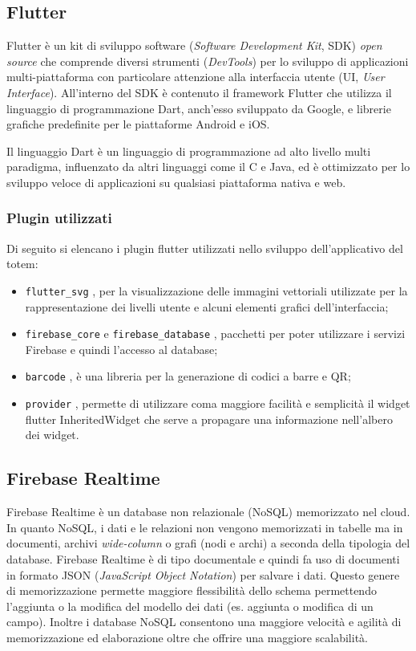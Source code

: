 \subsection{Flutter}
Flutter \cite{flutter} è un kit di sviluppo software (\textit{Software Development Kit}, SDK) \textit{open source} che comprende diversi strumenti (\textit{DevTools}) per lo sviluppo di applicazioni multi-piattaforma con particolare attenzione alla interfaccia utente (UI, \textit{User Interface}). All'interno del SDK è contenuto il framework Flutter che utilizza il linguaggio di programmazione Dart, anch'esso sviluppato da Google, e librerie grafiche predefinite per le piattaforme Android e iOS.

Il linguaggio Dart è un linguaggio di programmazione ad alto livello multi paradigma, influenzato da altri linguaggi come il C e Java, ed è ottimizzato per lo sviluppo veloce di applicazioni su qualsiasi piattaforma nativa e web.

\subsubsection{Plugin utilizzati}
Di seguito si elencano i plugin flutter utilizzati nello sviluppo dell'applicativo del totem:

\begin{itemize}
    \item \texttt{flutter\_svg} \cite{providerPlugin}, per la visualizzazione delle immagini vettoriali utilizzate per la rappresentazione dei livelli utente e alcuni elementi grafici dell'interfaccia;
    \item \texttt{firebase\_core} \cite{firebaseCorePlugin} e \texttt{firebase\_database} \cite{firebaseDatabasePlugin}, pacchetti per poter utilizzare i servizi Firebase e quindi l'accesso al database;
    \item \texttt{barcode} \cite{barcodePlugin}, è una libreria per la generazione di codici a barre e QR;
    \item \texttt{provider} \cite{providerPlugin}, permette di utilizzare coma maggiore facilità e semplicità il widget flutter InheritedWidget che serve a propagare una informazione nell'albero dei widget.
    
\end{itemize}
\subsection{Firebase Realtime}
Firebase Realtime \cite{firebase} è un database non relazionale (NoSQL) memorizzato nel cloud. In quanto NoSQL, i dati e le relazioni non vengono memorizzati in tabelle ma in documenti, archivi \textit{wide-column} o grafi (nodi e archi) a seconda della tipologia del database.
Firebase Realtime è di tipo documentale e quindi fa uso di documenti in formato JSON (\textit{JavaScript Object Notation}) per salvare i dati. Questo genere di memorizzazione permette maggiore flessibilità dello schema permettendo l'aggiunta o la modifica del modello dei dati (es. aggiunta o modifica di un campo). Inoltre i database NoSQL consentono una maggiore velocità e agilità di memorizzazione ed elaborazione oltre che offrire una maggiore scalabilità.
%
